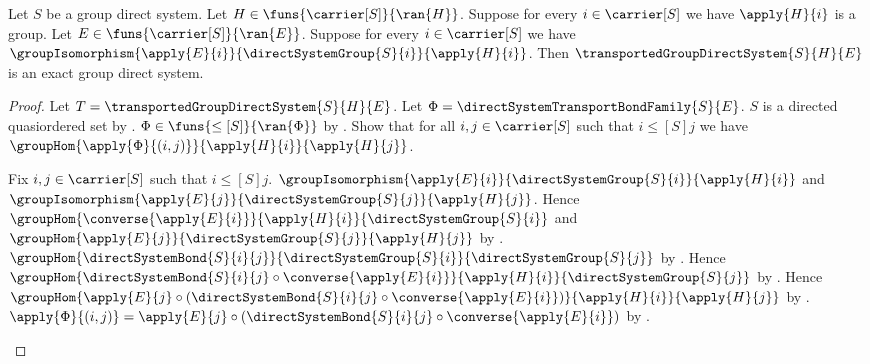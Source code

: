 \begin{theorem}\label{transported_group_direct_system_is_exact}
    Let $S$ be a group direct system.
    Let $H\in\funs{\carrier[S]}{\ran{H}}$.
    Suppose for every $i\in\carrier[S]$ we have
        $\apply{H}{i}$ is a group.
    Let $E\in\funs{\carrier[S]}{\ran{E}}$.
    Suppose for every $i\in\carrier[S]$ we have
        $\groupIsomorphism{\apply{E}{i}}
            {\directSystemGroup{S}{i}}{\apply{H}{i}}$.
    Then $\transportedGroupDirectSystem{S}{H}{E}$ is an exact
        group direct system.
\end{theorem}
\begin{proof}
    Let $T=\transportedGroupDirectSystem{S}{H}{E}$.
    Let $\Phi=\directSystemTransportBondFamily{S}{E}$.
    $S$ is a directed quasiordered set by
        .
    $\Phi\in\funs{\leq[S]}{\ran{\Phi}}$ by
        .
    Show that for all $i,j\in\carrier[S]$ such that
        $i\mathrel{\leq[S]}j$ we have
        $\groupHom{\apply{\Phi}{(i,j)}}
            {\apply{H}{i}}{\apply{H}{j}}$.
    \begin{subproof}
        Fix $i,j\in\carrier[S]$ such that $i\mathrel{\leq[S]}j$.
        $\groupIsomorphism{\apply{E}{i}}
            {\directSystemGroup{S}{i}}{\apply{H}{i}}$ and
            $\groupIsomorphism{\apply{E}{j}}
            {\directSystemGroup{S}{j}}{\apply{H}{j}}$.
        Hence $\groupHom{\converse{\apply{E}{i}}}
            {\apply{H}{i}}{\directSystemGroup{S}{i}}$ and
            $\groupHom{\apply{E}{j}}
            {\directSystemGroup{S}{j}}{\apply{H}{j}}$ by
            .
        $\groupHom{\directSystemBond{S}{i}{j}}
            {\directSystemGroup{S}{i}}{\directSystemGroup{S}{j}}$ by
            .
        Hence $\groupHom
            {\directSystemBond{S}{i}{j}\circ
                \converse{\apply{E}{i}}}
            {\apply{H}{i}}{\directSystemGroup{S}{j}}$ by
            .
        Hence $\groupHom
            {\apply{E}{j}\circ
                (\directSystemBond{S}{i}{j}\circ
                    \converse{\apply{E}{i}})}
            {\apply{H}{i}}{\apply{H}{j}}$ by
            .
        $\apply{\Phi}{(i,j)}=
            \apply{E}{j}\circ
                (\directSystemBond{S}{i}{j}\circ
                    \converse{\apply{E}{i}})$ by
            .
    \end{subproof}

\end{proof}
